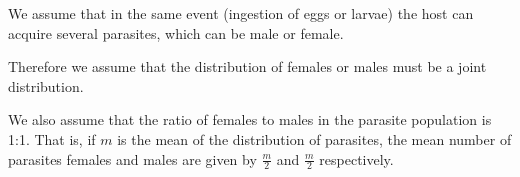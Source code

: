 \documentclass[12pt,a4paper]{article}
\theoremstyle{plain}%
\theoremstyle{definition}
\theoremstyle{remark}
\begin{document}
We assume that in the same event (ingestion of eggs or larvae) the host can acquire several parasites, which can be male or female.

Therefore we assume that the distribution of females or males must be a joint distribution.

We also assume that the ratio of females to males in the parasite population is 1:1.
That is, if $m$ is the mean of the distribution of parasites, the mean number of parasites females and males are given by $\frac{m}{2}$ and $\frac{m}{2}$ respectively.



\end{document}
